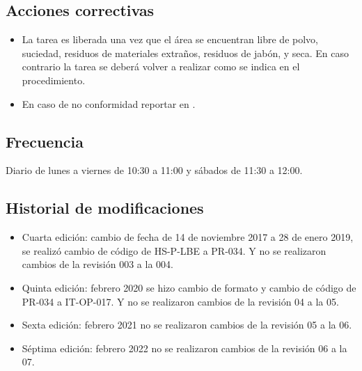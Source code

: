 \subsection{Acciones correctivas}

\begin{itemize}
	\item La tarea es liberada una vez que el área se encuentran libre de polvo, suciedad, residuos de materiales extraños, residuos de jabón, y seca. En caso contrario la tarea se deberá volver a realizar como se indica en el procedimiento.
	\item En caso de no conformidad reportar en \RAC.
\end{itemize}

\subsection{Frecuencia}

Diario de lunes a viernes de 10:30 a 11:00 y sábados de 11:30 a 12:00.

\subsection{Historial de modificaciones}

\begin{itemize}
	\item Cuarta edición: cambio de fecha de 14 de noviembre 2017 a 28 de enero 2019, se realizó cambio de código de HS-P-LBE a PR-034. Y no se realizaron cambios de la revisión 003 a la 004.
	\item Quinta edición: febrero 2020 se hizo cambio de formato y cambio de código de PR-034 a IT-OP-017. Y no se realizaron cambios de la revisión 04 a la 05.
	\item Sexta edición: febrero 2021 no se realizaron cambios de la revisión 05 a la 06.
	\item Séptima edición: febrero 2022 no se realizaron cambios de la revisión 06 a la 07.
\end{itemize}
